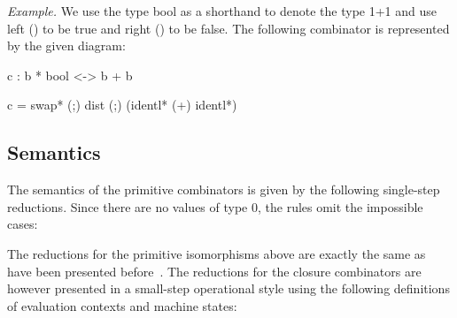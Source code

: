 \documentclass[preprint]{sigplanconf}
\begin{document}
\noindent 
\textit{Example.}  We use the type {{bool}} as a shorthand to denote
the type {{1+1}} and use {{left ()}} to be {{true}} and {{right ()}}
to be {{false}}. The following combinator is represented by the given
diagram:

{{c : b * bool <-> b + b}}

{{c = swap* (;) dist (;) (identl* (+) identl*)}}

\begin{center}
\end{center}

\subsection{Semantics}

The semantics of the primitive combinators is given by the following
single-step reductions. Since there are no values of type {{0}}, the rules
omit the impossible cases:
\begin{scriptsize}
\end{scriptsize}
The reductions for the primitive isomorphisms above are exactly the same as
have been presented before~\cite{infeffects}. The reductions for the closure
combinators are however presented in a small-step operational style using the
following definitions of evaluation contexts and machine states:
\end{document}
